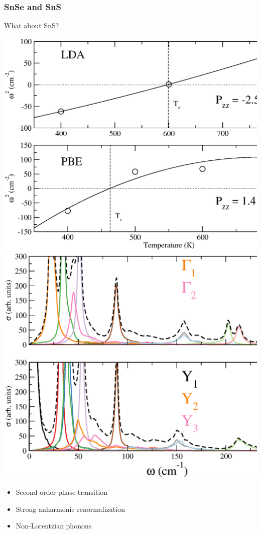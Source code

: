 \documentclass{beamer}
\begin{document}
\begin{frame}

\frametitle{SnSe and SnS}

What about SnS?
\begin{center}
 \includegraphics[width=0.43\linewidth]{Pictures/SnS/freq-sns.eps}
 \includegraphics[width=0.40\linewidth]{Pictures/SnS/spf-sns.eps}
\end{center}
\begin{itemize}
\item Second-order phase transition
\item Strong anharmonic renormalization
\item Non-Lorentzian phonons
\end{itemize}

\end{frame}

\end{document}
